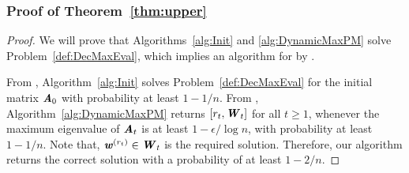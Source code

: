 \subsubsection*{Proof of Theorem~\ref{thm:upper}}
\begin{proof}

We will prove that Algorithms~\ref{alg:Init} and \ref{alg:DynamicMaxPM} solve Problem~\ref{def:DecMaxEval}, which implies an algorithm for  by .

From , Algorithm~\ref{alg:Init} solves Problem~\ref{def:DecMaxEval} for the initial matrix $\AA_0$ with probability at least $1-1/n$. From , Algorithm~\ref{alg:DynamicMaxPM} returns $[r_t,\WW_t]$ for all $t\geq 1$, whenever the maximum eigenvalue of $\AA_t$ is at least $1-\epsilon/\log n$, with probability at least $1-1/n$. Note that, $\ww^{(r_t)}\in \WW_t$ is the required solution. Therefore, our algorithm returns the correct solution with a probability of at least $1-2/n$.


\end{proof}
